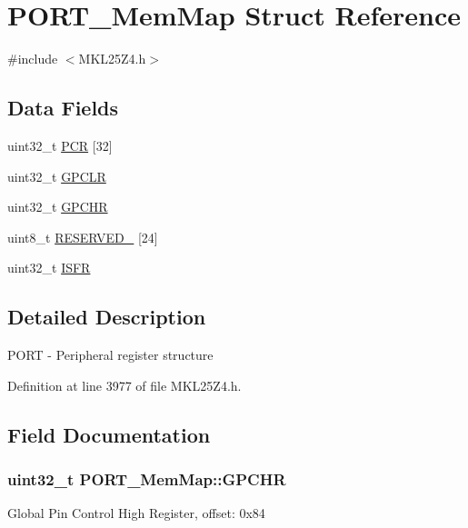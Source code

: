 \hypertarget{struct_p_o_r_t___mem_map}{}\section{P\+O\+R\+T\+\_\+\+Mem\+Map Struct Reference}
\label{struct_p_o_r_t___mem_map}


{\ttfamily \#include $<$M\+K\+L25\+Z4.\+h$>$}

\subsection*{Data Fields}
\begin{DoxyCompactItemize}
\item 
uint32\+\_\+t \hyperlink{struct_p_o_r_t___mem_map_a1c54a8f1741fade8daf28198fee43ddd}{P\+CR} \mbox{[}32\mbox{]}
\item 
uint32\+\_\+t \hyperlink{struct_p_o_r_t___mem_map_a837c289643f8cec958b1f01c086b558a}{G\+P\+C\+LR}
\item 
uint32\+\_\+t \hyperlink{struct_p_o_r_t___mem_map_a84f8893cbefd6a3eff18b455f9069b29}{G\+P\+C\+HR}
\item 
uint8\+\_\+t \hyperlink{struct_p_o_r_t___mem_map_ad85e48d2b0e879333bf0dcb5a0af21f5}{R\+E\+S\+E\+R\+V\+E\+D\+\_} \mbox{[}24\mbox{]}
\item 
uint32\+\_\+t \hyperlink{struct_p_o_r_t___mem_map_a53c86a08f430dc915a312efe74ba83e6}{I\+S\+FR}
\end{DoxyCompactItemize}


\subsection{Detailed Description}
P\+O\+RT -\/ Peripheral register structure 

Definition at line 3977 of file M\+K\+L25\+Z4.\+h.



\subsection{Field Documentation}
\subsubsection[{\texorpdfstring{G\+P\+C\+HR}{GPCHR}}]{\setlength{\rightskip}{0pt plus 5cm}uint32\+\_\+t P\+O\+R\+T\+\_\+\+Mem\+Map\+::\+G\+P\+C\+HR}\hypertarget{struct_p_o_r_t___mem_map_a84f8893cbefd6a3eff18b455f9069b29}{}\label{struct_p_o_r_t___mem_map_a84f8893cbefd6a3eff18b455f9069b29}
Global Pin Control High Register, offset\+: 0x84 

